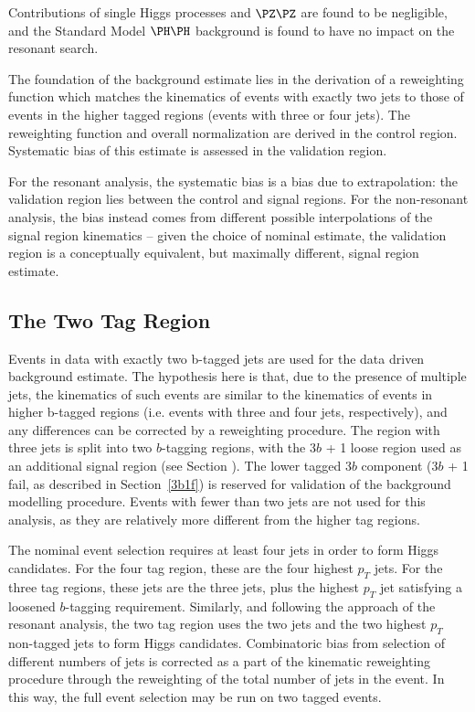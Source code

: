 Contributions of single Higgs processes and $\PZ\PZ$ are found 
to be negligible, and the Standard Model $\higgs\higgs$ background
is found to have no impact on the resonant search.

The foundation of the background estimate lies in the derivation of a
reweighting function which matches the kinematics of events with exactly two
\btagged jets to those of events in the higher tagged regions (events with three or four 
\btagged jets). The reweighting function and overall normalization are derived in 
the control region. Systematic bias of this estimate is assessed in the validation 
region. 

For the resonant analysis, the systematic bias is a bias due to extrapolation:
the validation region lies between the control and signal regions. For the 
non-resonant analysis, the bias instead comes from different possible interpolations
of the signal region kinematics -- given the choice of nominal estimate, the validation
region is a conceptually equivalent, but maximally different, signal region estimate.

\subsection{The Two Tag Region}

Events in data with exactly two b-tagged jets are used for the data driven 
background estimate. The hypothesis here is that, due to the presence of 
multiple \btagged jets, the kinematics of such events are similar to the 
kinematics of events in higher b-tagged regions (i.e. events with three and 
four \btagged jets, respectively), and any differences can be corrected by a 
reweighting procedure. The region with three \btagged jets is split into 
two $b$-tagging regions, with the 3$b$ + 1 loose region used as an additional signal 
region (see Section ). The lower tagged 3$b$ component 
(3$b$ + 1 fail, as described in Section~\ref{3b1f}) is reserved for validation
of the background modelling procedure. Events with fewer than two \btagged jets are not 
used for this analysis, as they are relatively more different from the higher tag regions.

The nominal event selection requires at least four jets in order to form Higgs
candidates. For the four tag region, these are the four highest $p_{T}$ \btagged 
jets. For the three tag regions, these jets are the three \btagged jets, plus the 
highest $p_{T}$ jet satisfying a loosened $b$-tagging requirement. Similarly, and following 
the approach of the resonant analysis, the two tag region uses the two \btagged jets 
and the two highest $p_{T}$ non-tagged jets to form Higgs candidates. Combinatoric bias 
from selection of different numbers of \btagged jets is corrected as a part of the kinematic 
reweighting procedure through the reweighting of the total number of jets in the event. In this way, 
the full event selection may be run on two tagged events. 

